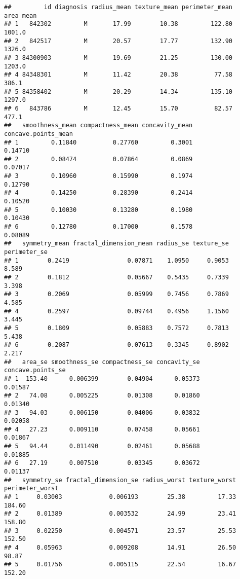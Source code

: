 \documentclass[
]{article}
\begin{document}
\begin{verbatim}
##         id diagnosis radius_mean texture_mean perimeter_mean area_mean
## 1   842302         M       17.99        10.38         122.80    1001.0
## 2   842517         M       20.57        17.77         132.90    1326.0
## 3 84300903         M       19.69        21.25         130.00    1203.0
## 4 84348301         M       11.42        20.38          77.58     386.1
## 5 84358402         M       20.29        14.34         135.10    1297.0
## 6   843786         M       12.45        15.70          82.57     477.1
##   smoothness_mean compactness_mean concavity_mean concave.points_mean
## 1         0.11840          0.27760         0.3001             0.14710
## 2         0.08474          0.07864         0.0869             0.07017
## 3         0.10960          0.15990         0.1974             0.12790
## 4         0.14250          0.28390         0.2414             0.10520
## 5         0.10030          0.13280         0.1980             0.10430
## 6         0.12780          0.17000         0.1578             0.08089
##   symmetry_mean fractal_dimension_mean radius_se texture_se perimeter_se
## 1        0.2419                0.07871    1.0950     0.9053        8.589
## 2        0.1812                0.05667    0.5435     0.7339        3.398
## 3        0.2069                0.05999    0.7456     0.7869        4.585
## 4        0.2597                0.09744    0.4956     1.1560        3.445
## 5        0.1809                0.05883    0.7572     0.7813        5.438
## 6        0.2087                0.07613    0.3345     0.8902        2.217
##   area_se smoothness_se compactness_se concavity_se concave.points_se
## 1  153.40      0.006399        0.04904      0.05373           0.01587
## 2   74.08      0.005225        0.01308      0.01860           0.01340
## 3   94.03      0.006150        0.04006      0.03832           0.02058
## 4   27.23      0.009110        0.07458      0.05661           0.01867
## 5   94.44      0.011490        0.02461      0.05688           0.01885
## 6   27.19      0.007510        0.03345      0.03672           0.01137
##   symmetry_se fractal_dimension_se radius_worst texture_worst perimeter_worst
## 1     0.03003             0.006193        25.38         17.33          184.60
## 2     0.01389             0.003532        24.99         23.41          158.80
## 3     0.02250             0.004571        23.57         25.53          152.50
## 4     0.05963             0.009208        14.91         26.50           98.87
## 5     0.01756             0.005115        22.54         16.67          152.20

\end{verbatim}
\end{document}
